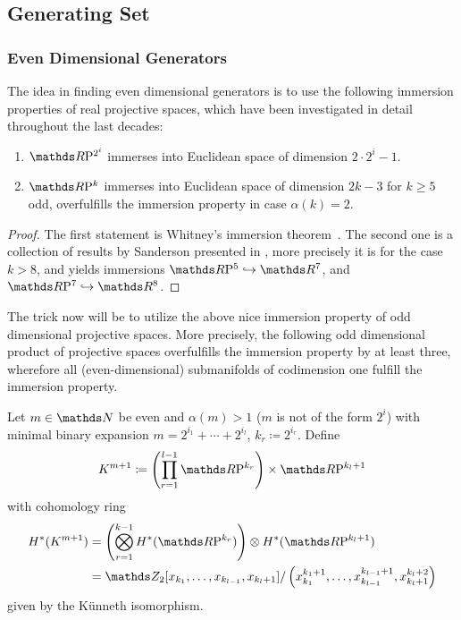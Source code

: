 \subsection{Generating Set}
\subsubsection{Even Dimensional Generators}
The idea in finding even dimensional generators is to use the
following immersion properties of real projective spaces, which have
been investigated in detail throughout the last decades:
\begin{Lem}\label{lem:immersionrealprojspace}
  \begin{enumerate}
  \item
    $\RP{2^i}$ immerses into Euclidean space of dimension
    $2\cdot2^i-1$.
  \item
    $\RP{k}$ immerses into Euclidean space of dimension
    $2k-3$ for $k\geq 5$ odd, \idest overfulfills the immersion
    property in case $\alpha(k)=2$.
  \end{enumerate}
  \begin{proof}
    The first statement is Whitney's immersion
    theorem~\cite{whitneyimmersiontheorem}.
    The second one is a collection of results by Sanderson
    presented in \cite{sanderson}, more precisely it is
    \cite[Theorem~(5.3)]{sanderson} for the case $k>8$, and
    \cite[Theorem~(4.1)]{sanderson} yields immersions
    $\RP 5\immto\R^7$, and $\RP 7\immto\R^8$.
  \end{proof}
\end{Lem}
The trick now will be to utilize the above nice immersion property of
odd dimensional projective spaces. More precisely, the following odd
dimensional product of projective spaces overfulfills the immersion
property by at least three, wherefore all (even-dimensional)
submanifolds of codimension one fulfill the immersion property.
\begin{Def}
  Let $m\in\Nat$ be even and $\alpha(m)>1$ (\idest $m$ is not of the
  form $2^{i}$) with minimal binary expansion 
  $m=2^{i_1}+\dotsb+2^{i_l}$, $k_r\coloneqq 2^{i_r}$.
  Define
  \begin{gather*}
    K^{m+1}\coloneqq \left(\prod_{r=1}^{l-1} \RP{k_r}\right) \times \RP{k_l+1}
  \end{gather*}
  with cohomology ring
  \begin{align*}
    \H^*(K^{m+1})
    &= \left(\bigotimes_{r=1}^{k-1}\H^*(\RP{k_r})\right)
      \otimes \H^*(\RP{k_l+1}) \\
    &= \Zmod2[x_{k_1},\dotsc,x_{k_{l-1}}, x_{k_l+1}]/
      \left( x_{k_1}^{k_1+1},\dotsc,x_{k_{l-1}}^{k_{l-1}+1},
      x_{k_l+1}^{k_l+2} \right)
  \end{align*}
  given by the Künneth isomorphism.
\end{Def}
